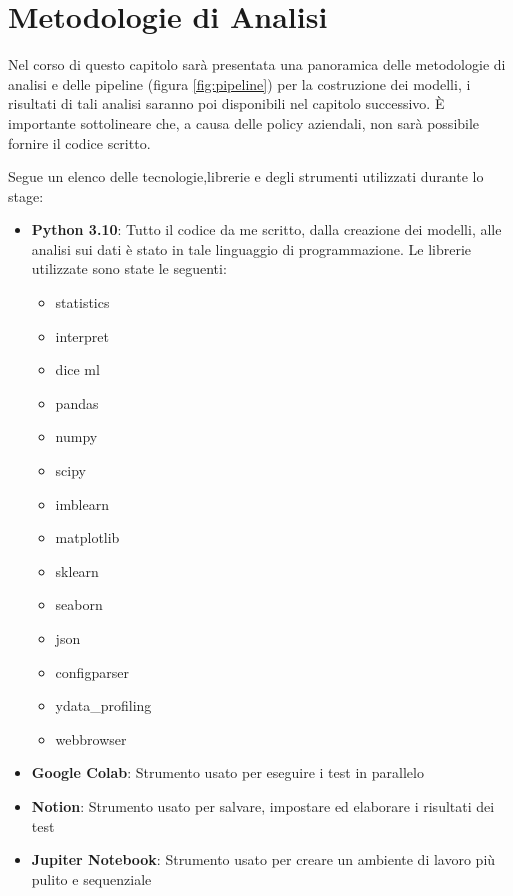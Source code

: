 \chapter{Metodologie di Analisi}
\label{ch:capitolo3}

\begin{flushleft}
    
Nel corso di questo capitolo sarà presentata una panoramica delle metodologie di analisi e delle pipeline (figura \ref{fig:pipeline}) per la costruzione dei modelli, i risultati di tali analisi saranno poi disponibili nel capitolo successivo.
È importante sottolineare che, a causa delle policy aziendali, non sarà possibile fornire il codice scritto.

Segue un elenco delle tecnologie,librerie e degli strumenti utilizzati durante lo stage:
\begin{itemize}
    \item \textbf{Python 3.10}: Tutto il codice da me scritto, dalla creazione dei modelli, alle analisi sui dati è stato in tale linguaggio di programmazione.
    Le librerie utilizzate sono state le seguenti:
    \begin{itemize}
    \item statistics
    \item interpret
    \item dice ml
    \item pandas
    \item numpy
    \item scipy
    \item imblearn
    \item matplotlib
    \item sklearn
    \item seaborn
    \item json
    \item configparser
    \item ydata\_profiling
    \item webbrowser
\end{itemize}
    \item \textbf{Google Colab}: Strumento usato per eseguire i test in parallelo
    \item \textbf{Notion}: Strumento usato per salvare, impostare ed elaborare i risultati dei test
    \item \textbf{Jupiter Notebook}: Strumento usato per creare un ambiente di lavoro più pulito e sequenziale

\end{itemize}


\end{flushleft}
